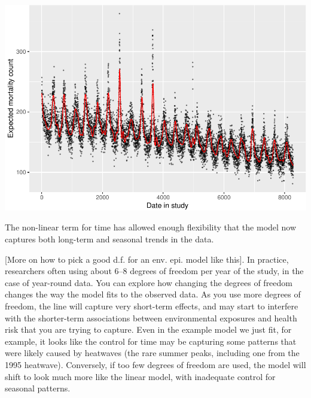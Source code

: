 \documentclass[
]{book}
\newenvironment{Shaded}{\begin{snugshade}}{\end{snugshade}}
\newcommand{\AttributeTok}[1]{\textcolor[rgb]{0.77,0.63,0.00}{#1}}
\newcommand{\FloatTok}[1]{\textcolor[rgb]{0.00,0.00,0.81}{#1}}
\newcommand{\FunctionTok}[1]{\textcolor[rgb]{0.00,0.00,0.00}{#1}}
\newcommand{\NormalTok}[1]{#1}
\newcommand{\SpecialCharTok}[1]{\textcolor[rgb]{0.00,0.00,0.00}{#1}}
\newcommand{\StringTok}[1]{\textcolor[rgb]{0.31,0.60,0.02}{#1}}
\begin{document}
\begin{Shaded}
\end{Shaded}

\includegraphics{adv_epi_analysis_files/figure-latex/unnamed-chunk-52-1.pdf}

The non-linear term for time has allowed enough flexibility that the model now
captures both long-term and seasonal trends in the data.

{[}More on how to pick a good d.f. for an env. epi. model like this{]}. In practice,
researchers often using about 6--8 degrees of freedom per year of the study, in
the case of year-round data. You can explore how changing the degrees of freedom
changes the way the model fits to the observed data. As you use more degrees of
freedom, the line will capture very short-term effects, and may start to
interfere with the shorter-term associations between environmental exposures and
health risk that you are trying to capture. Even in the example model we just
fit, for example, it looks like the control for time may be capturing some
patterns that were likely caused by heatwaves (the rare summer peaks, including
one from the 1995 heatwave). Conversely, if too few degrees of freedom are used,
the model will shift to look much more like the linear model, with inadequate
control for seasonal patterns.
\end{document}
